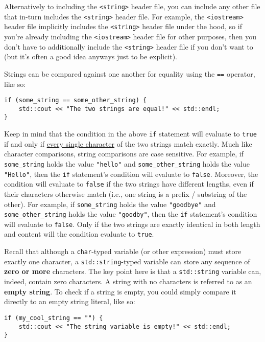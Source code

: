 \documentclass{article}
\begin{document}
Alternatively to including the \texttt{<string>} header file, you can include any other file that in-turn includes the \texttt{<string>} header file. For example, the \texttt{<iostream>} header file implicitly includes the \texttt{<string>} header file under the hood, so if you're already including the \texttt{<iostream>} header file for other purposes, then you don't have to additionally include the \texttt{<string>} header file if you don't want to (but it's often a good idea anyways just to be explicit).

Strings can be compared against one another for equality using the \texttt{==} operator, like so:

\begin{verbatim}
if (some_string == some_other_string) {
    std::cout << "The two strings are equal!" << std::endl;
}
\end{verbatim}

Keep in mind that the condition in the above \texttt{if} statement will evaluate to \texttt{true} if and only if \ul{every single character} of the two strings match exactly. Much like character comparisons, string comparisons are case sensitive. For example, if \texttt{some\_string} holds the value \texttt{"hello"} and \texttt{some\_other\_string} holds the value \texttt{"Hello"}, then the \texttt{if} statement's condition will evaluate to \texttt{false}. Moreover, the condition will evaluate to \texttt{false} if the two strings have different lengths, even if their characters otherwise match (i.e., one string is a prefix / substring of the other). For example, if \texttt{some\_string} holds the value \texttt{"goodbye"} and \texttt{some\_other\_string} holds the value \texttt{"goodby"}, then the \texttt{if} statement's condition will evaluate to \texttt{false}. Only if the two strings are exactly identical in both length and content will the condition evaluate to \texttt{true}.

Recall that although a \texttt{char}-typed variable (or other expression) must store exactly one character, a \texttt{std::string}-typed variable can store any sequence of \textbf{zero or more} characters. The key point here is that a \texttt{std::string} variable can, indeed, contain zero characters. A string with no characters is referred to as an \textbf{empty string}. To check if a string is empty, you could simply compare it directly to an empty string literal, like so:

\begin{verbatim}
if (my_cool_string == "") {
    std::cout << "The string variable is empty!" << std::endl;
}
\end{verbatim}
\end{document}
